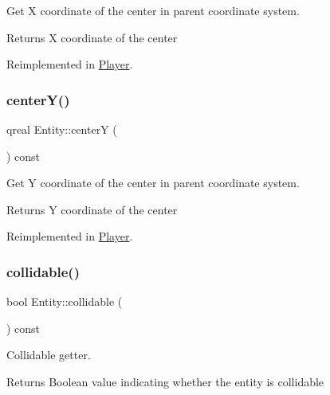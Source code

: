 Get X coordinate of the center in parent coordinate system. 

\begin{DoxyReturn}{Returns}
X coordinate of the center 
\end{DoxyReturn}


Reimplemented in \hyperlink{class_player_ac5fcb472ea5e7e2222c13e086ced0aa1}{Player}.

\mbox{\label{class_entity_ac0af460a15e0d087d8fbbbe1e6f7dd95}} 
\subsubsection{\texorpdfstring{center\+Y()}{centerY()}}
{\footnotesize\ttfamily qreal Entity\+::centerY (\begin{DoxyParamCaption}{ }\end{DoxyParamCaption}) const\hspace{0.3cm}{\ttfamily [virtual]}}



Get Y coordinate of the center in parent coordinate system. 

\begin{DoxyReturn}{Returns}
Y coordinate of the center 
\end{DoxyReturn}


Reimplemented in \hyperlink{class_player_ac67429e56fbd74495b4614b7b27ca5f6}{Player}.

\mbox{\label{class_entity_a0d21d9ca00bc81494aec120c0840c191}} 
\subsubsection{\texorpdfstring{collidable()}{collidable()}}
{\footnotesize\ttfamily bool Entity\+::collidable (\begin{DoxyParamCaption}{ }\end{DoxyParamCaption}) const}



Collidable getter. 

\begin{DoxyReturn}{Returns}
Boolean value indicating whether the entity is collidable 
\end{DoxyReturn}
\mbox{\label{class_entity_ad14bf88ca550e2e5b13438a3faf545e6}} 
